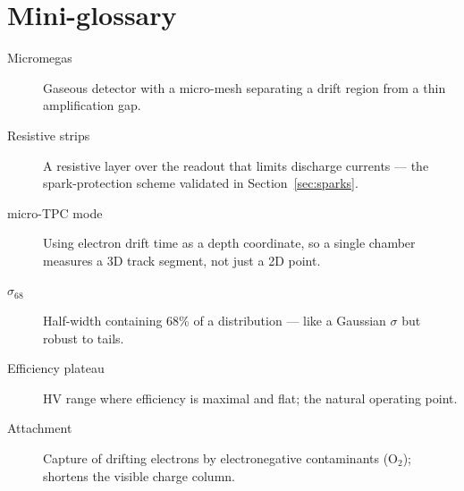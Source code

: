 \documentclass[11pt]{article}
\begin{document}
\section{Mini-glossary}
\begin{description}
  \item[Micromegas] Gaseous detector with a micro-mesh separating a drift
  region from a thin amplification gap.
  \item[Resistive strips] A resistive layer over the readout that limits
  discharge currents --- the spark-protection scheme validated in
  Section~\ref{sec:sparks}.
  \item[micro-TPC mode] Using electron drift time as a depth coordinate, so a
  single chamber measures a 3D track segment, not just a 2D point.
  \item[$\sigma_{68}$] Half-width containing 68\% of a distribution ---
  like a Gaussian $\sigma$ but robust to tails.
  \item[Efficiency plateau] HV range where efficiency is maximal and flat;
  the natural operating point.
  \item[Attachment] Capture of drifting electrons by electronegative
  contaminants (O$_2$); shortens the visible charge column.
\end{description}
\end{document}
